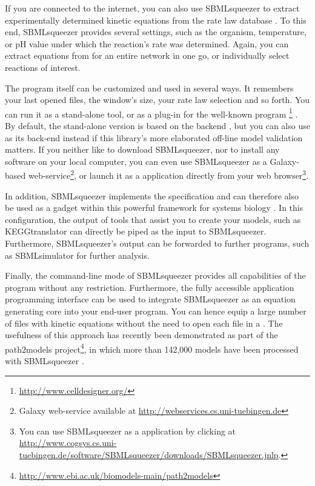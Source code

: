 If you are connected to the internet, you can also use SBMLsqueezer to extract
experimentally determined kinetic equations from the rate law database \SABIO
\citep{Wittig2006, Rojas2007, Krebs2007, Wittig2012}.
To this end, SBMLsqueezer provides several settings, such as the organism,
temperature, or pH value under which the reaction's rate was determined. Again,
you can extract equations from \SABIO for an entire network in one go, or
individually select reactions of interest.

The program itself can be customized and used in several ways. It remembers your
last opened files, the window's size, your rate law selection and so forth.
You can run it as a stand-alone tool, or as a plug-in for the well-known program
\CellDesigner\footnote{\url{http://www.celldesigner.org/}}
\citep{Funahashi2003, Funahashi2006, Funahashi2007a, Funahashi2008}.
By default, the stand-alone version is based on the \JSBML backend 
\citep{Draeger2011b}, but you can also use \libSBML \citep{Bornstein2008} as its
\SBML back-end instead if this library's more elaborated off-line model validation
matters.
If you neither like to download SBMLsqueezer, nor to install any software on
your local computer, you can even use SBMLsqueezer as a Galaxy-based
web-service\footnote{Galaxy web-service available at \url{http://webservices.cs.uni-tuebingen.de}},
or launch it as a \JavaWebStart application directly from your web
browser\footnote{You can use SBMLsqueezer as a \JavaWebStart application by
clicking at \url{http://www.cogsys.cs.uni-tuebingen.de/software/SBMLsqueezer/downloads/SBMLsqueezer.jnlp}.}.

In addition, SBMLsqueezer implements the \Garuda specification and can therefore
also be used as a gadget within this powerful framework for systems biology
\citep{Ghosh2011}. In this configuration, the output of tools that assist you
to create your models, such as KEGGtranslator \citep{Wrzodek2011, Wrzodek2013}
can directly be piped as the input to SBMLsqueezer. Furthermore, SBMLsqueezer's
output can be forwarded to further programs, such as SBMLsimulator
\citep{Keller2013} for further analysis.

Finally, the command-line mode of SBMLsqueezer provides all capabilities of the
program without any restriction.
Furthermore, the fully accessible application programming interface can be used
to integrate SBMLsqueezer as an equation generating core into your end-user
program.
You can hence equip a large number of files with kinetic equations without the
need to open each file in a \GUI.
The usefulness of this approach has recently been demonstrated as part of the
path2models project\footnote{\url{http://www.ebi.ac.uk/biomodels-main/path2models}},
in which more than 142,000 \SBML models have been processed with SBMLsqueezer
\citep{Buechel2013}.

